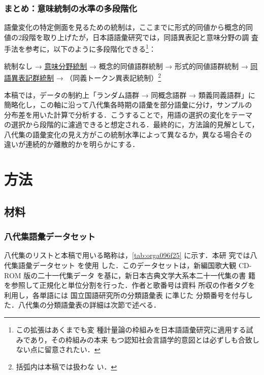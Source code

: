 \documentclass[submit]{ipsj}
\renewcommand{\ref}{\cref}
\begin{document}
\subsubsection{まとめ：意味統制の水準の多段階化}
\label{sec:org458f1d0}
語彙変化の特定側面を見るための統制は，ここまでに形式的同値から概念的同
値の2段階を取り上げたが，日本語語彙研究では，同語異表記と意味分野の調
査手法を参考に，以下のように多段階化できる\footnote{この拡張はあくまでも変
種計量論の枠組みを日本語語彙研究に適用する試みであり，その枠組みの本来
もつ認知社会言語学的意図とは必ずしも合致しない点に留意されたい．}：

統制なし → \uline{意味分野統制} → 概念的同値語群統制 → 形式的同値語群統制 → \uline{同
語異表記群統制} → （同義トークン異表記統制）\footnote{括弧内は本稿では扱わな
い．}

本稿では，データの制約上「ランダム語群 → 同概念語群 → 類義同義語群」に
簡略化し，この軸に沿って八代集各時期の語彙を部分語彙に分け，サンプルの
分布差を用いた計算で分析する．こうすることで，用語の選択の変化をテーマ
の選択から段階的に濾過できると想定される．最終的に，方法論的見解として，
八代集の語彙変化の見え方がこの統制水準によって異なるか，異なる場合その
違いが連続的か離散的かを明らかにする．
\section{方法\label{org2f3b7ad}}
\label{sec:orge845344}
\subsection{材料\label{org5e1b5c9}}
\label{sec:orgf9f8d71}
\subsubsection{八代集語彙データセット\label{org0433d88}}
\label{sec:org7dcb370}
八代集のリストと本稿で用いる略称は，\ref{tab:orga096f25} に示す．本研
究では八代集語彙データセット \cite{Hodoscek2022Developmenta}を使用
した．このデータセットは，新編国歌大観 CD-ROM 版の二十一代集データ
\cite{shinhen1996CDROM} を基に，新日本古典文学大系本二十一代集の書
籍を参照して正規化と単位分割を行った．作者と歌番号は資料
\cite{nakamura1999Kokubungaku} 所収の作者タグを利用し，各単語には
国立国語研究所の分類語彙表 \cite{nakano1994Bunruigoihyo} に準じた
分類番号を付与した．八代集の分類語彙表の詳細は次節で述べる．
\end{document}
